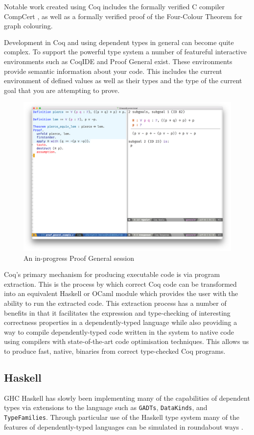 \documentclass[a4paper, notitlepage]{report}
\begin{document}
Notable work created using Coq includes the formally verified C compiler
CompCert \cite{leroy_compiler_2009}, as well as a formally verified proof of the
Four-Colour Theorem \cite{gonthier_formal_2008} for graph colouring.

Development in Coq and using dependent types in general can become quite
complex. To support the powerful type system a number of featureful interactive
environments such as CoqIDE and Proof General \cite{proof_general} exist. These
environments provide semantic information about your code. This includes the
current environment of defined values as well as their types and the type of the
current goal that you are attempting to prove.

\begin{figure}[H]
\centering
\includegraphics[width=0.85\linewidth]{./fig/proof_general.png}
\caption{An in-progress Proof General session}
\end{figure}

Coq's primary mechanism for producing executable code is via program extraction.
This is the process by which correct Coq code can be transformed into an
equivalent Haskell or OCaml module which provides the user with the ability to
run the extracted code. This extraction process has a number of benefits in that
it facilitates the expression and type-checking of interesting correctness
properties in a dependently-typed language while also providing a way to compile
dependently-typed code written in the system to native code using compilers with
state-of-the-art code optimisation techniques. This allows us to produce fast,
native, binaries from correct type-checked Coq programs.

\subsection{Haskell}
\label{sec:orgd9cdfb9}
GHC Haskell has slowly been implementing many of the capabilities of dependent
types via extensions to the language such as \texttt{GADTs}, \texttt{DataKinds}, and
\texttt{TypeFamilies}. Through particular use of the Haskell type system many of the
features of dependently-typed languages can be simulated in roundabout ways
\cite{mcbride_faking_2002,lindley_hasochism_2013}.
\end{document}
